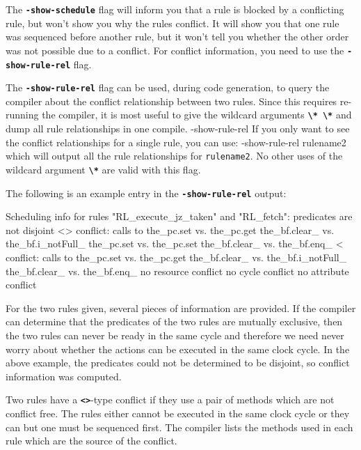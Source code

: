 \documentclass{article}
\newcommand{\te}[1]{\texttt{#1}}
\newenvironment{centerboxverbatim}
  {\center
   \boxedverbatim}
  {\endboxedverbatim
  {\endcenter }}
\begin{document}
The {\bf\tt -show-schedule} flag will inform you that a rule is
blocked by a conflicting rule, but won't show you why the rules
conflict.  It will show you that one rule was sequenced before another
rule, but it won't tell you whether the other order was not possible
due to a conflict.  For conflict information, you need to use the
{\bf\tt -show-rule-rel} flag.

The {\bf\tt -show-rule-rel} flag can be used, during code generation,
to query the compiler about the conflict relationship between two
rules.  Since this requires re-running the compiler, it is most useful
to give the wildcard arguments {\bf\tt \verb|\* \*|} and dump all rule
relationships in one compile.
\begin{centerboxverbatim}
-show-rule-rel \* \*
\end{centerboxverbatim}
If you only want to see the conflict relationships for a single rule,
you can use:
\begin{centerboxverbatim}
 -show-rule-rel \* rulename2
\end{centerboxverbatim}
which will output all the rule relationships for \te{rulename2}.  No
other uses of the wildcard argument  {\bf\tt \verb|\*|} are valid with
this flag.

The following is an example entry in the {\bf\tt -show-rule-rel} output:

\begin{centerboxverbatim}
Scheduling info for rules "RL_execute_jz_taken" and "RL_fetch":
predicates are not disjoint
    <>
    conflict:
    calls to
      the_pc.set vs. the_pc.get
      the_bf.clear_ vs. the_bf.i_notFull_
      the_pc.set vs. the_pc.set
      the_bf.clear_ vs. the_bf.enq_
    <
    conflict:
    calls to
      the_pc.set vs. the_pc.get
      the_bf.clear_ vs. the_bf.i_notFull_
      the_bf.clear_ vs. the_bf.enq_
    no resource conflict
    no cycle conflict
    no attribute conflict
\end{centerboxverbatim}

For the two rules given, several pieces of information are provided.
If the compiler can determine that the predicates of the two rules are
mutually exclusive, then the two rules can never be ready in the same
cycle and therefore we need never worry about whether the actions can
be executed in the same clock cycle.  In the above example, the predicates
could not be determined to be disjoint, so conflict information was
computed.

Two rules have a {\bf\tt <>}-type conflict if they use a pair of
methods which are not conflict free.  The rules either cannot be
executed in the same clock cycle or they can but one must be sequenced
first.  The compiler lists the methods used in each rule which are the
source of the conflict.
\end{document}
